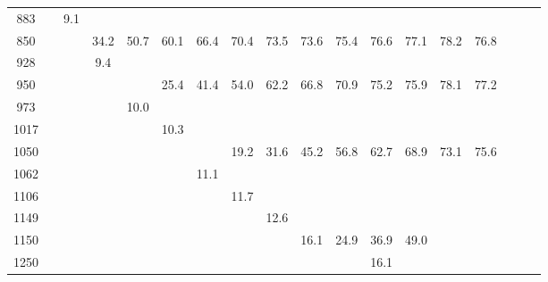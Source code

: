 \begin{table}[ht]
\begin{tabular}{c|ccccccccccccccccc}
    883  &         &   9.1  &          &          &          &          &           &           &          &         &        &      &      &       \\
    850  &         &        &  34.2    &   50.7   &   60.1   &   66.4   &   70.4    &   73.5    &    73.6  &   75.4  &   76.6 & 77.1 & 78.2 &  76.8 \\
    928  &         &        &   9.4    &          &          &          &           &           &          &         &        &      &      &       \\
    950  &         &        &          &          &   25.4   &   41.4   &   54.0    &   62.2    &    66.8  &   70.9  &   75.2 & 75.9 & 78.1 &  77.2 \\
    973  &         &        &          &   10.0   &          &          &           &           &          &         &        &      &      &       \\
    1017 &         &        &          &          &   10.3   &          &           &           &          &         &        &      &      &       \\
    1050 &         &        &          &          &          &          &   19.2    &   31.6    &    45.2  &   56.8  &   62.7 & 68.9 & 73.1 &  75.6 \\
    1062 &         &        &          &          &          &   11.1   &           &           &          &         &        &      &      &       \\
    1106 &         &        &          &          &          &          &   11.7    &           &          &         &        &      &      &       \\
    1149 &         &        &          &          &          &          &           &   12.6    &          &         &        &      &      &       \\
    1150 &         &        &          &          &          &          &           &           &    16.1  &   24.9  &   36.9 & 49.0 &      &       \\
    1250 &         &        &          &          &          &          &           &           &          &         &   16.1 &      &      &       \\
    \hline
         \hline
  \end{tabular}
  \label{tab:signal_filter_eff}
\end{table}


